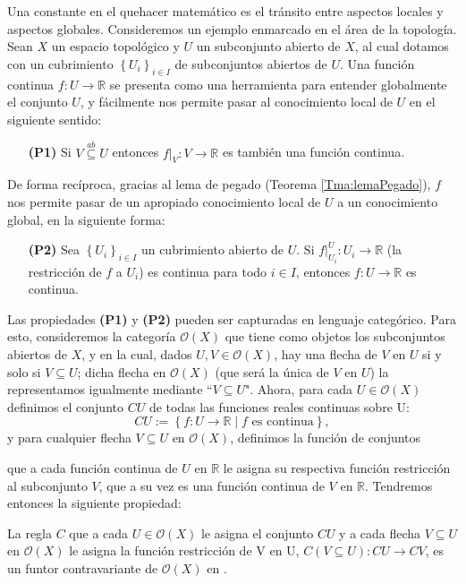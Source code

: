 Una constante en el quehacer matemático es el tránsito entre aspectos locales y aspectos globales. Consideremos un ejemplo enmarcado en el área de la topología. Sean $X$ un espacio topológico y $U$ un subconjunto abierto de $X$, al cual dotamos con un cubrimiento $\left\lbrace U_i\right\rbrace_{i\in I}$ de subconjuntos abiertos de $U$. Una función continua $f:U\to \mathbb{R}$ se presenta como una herramienta para entender globalmente el conjunto $U$, y fácilmente nos permite pasar al conocimiento local de $U$ en el siguiente sentido:
\begin{itemize}
   \item[\textbf{(P1)}] Si $V\stackrel{ab}\subseteq U$ entonces $f|_V:V\to\mathbb{R}$ es también una función continua. 
\end{itemize}
De forma recíproca, gracias al lema de pegado (Teorema \ref{Tma:lemaPegado}), $f$ nos permite pasar de un apropiado conocimiento local de $U$ a un conocimiento global, en la siguiente forma:
\begin{itemize}
   \item[\textbf{(P2)}] Sea $\left\lbrace U_i\right\rbrace_{i\in I}$ un cubrimiento abierto de $U$. Si $f|^{U}_{U_i}:U_i\to\mathbb{R}$ (la restricción de $f$ a $U_i$) es continua para todo $i\in I$, entonces $f:U\to\mathbb{R}$ es continua.
\end{itemize}
Las propiedades \textbf{(P1)} y \textbf{(P2)} pueden ser capturadas en lenguaje categórico. Para esto, consideremos la categoría $\mathcal{O}(X)$ que tiene como objetos los subconjuntos abiertos de $X$, y en la cual, dados $U,V\in \mathcal{O}(X)$, hay una flecha de $V$ en $U$ si y solo si $V\subseteq U$; dicha flecha en $\mathcal{O}(X)$ (que será la única de $V$ en $U$) la representamos igualmente mediante ``$V\subseteq U$". Ahora, para cada $U\in\mathcal{O}(X)$ definimos el conjunto $CU$ de todas las funciones reales continuas sobre U:
$$
CU:=\left\lbrace f:U\to\mathbb{R}\mid f \text{ es continua}\right\rbrace,
$$
y para cualquier flecha $V\subseteq U$ en $\mathcal{O}(X)$, definimos la función de conjuntos

que a cada función continua de $U$ en $\mathbb{R}$ le asigna su respectiva función restricción al subconjunto $V$, que a su vez es una función continua de $V$ en $\mathbb{R}$. Tendremos entonces la siguiente propiedad:
\begin{Prop}\label{Prop:P1}
   La regla $C$ que a cada $U\in\mathcal{O}(X)$ le asigna el conjunto $CU$ y a cada flecha $V\subseteq U$ en $\mathcal{O}(X)$ le asigna la función restricción de V en U, $C(V\subseteq U): CU\to CV$, es un funtor contravariante de $\mathcal{O}(X)$ en .
\end{Prop}
